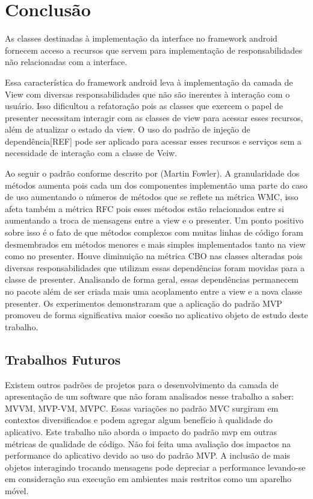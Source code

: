 \chapter{Conclusão}

As classes destinadas à implementação da interface no framework android fornecem
acceso a recursos que servem para implementação de responsabilidades não
relacionadas com a interface.

Essa característica do framework android leva à implementação da camada de View
com diversas responsabilidades que não são inerentes à interação com o
usuário. Isso dificultou a refatoração pois as classes que exercem o papel de
presenter necessitam interagir com as classes de view para acessar esses
recursos, além de atualizar o estado da view. O uso do padrão de injeção de
dependência[REF] pode ser aplicado para acessar esses recursos e serviços sem a
necessidade de interação com a classe de Veiw.

Ao seguir o padrão conforme descrito por (Martin Fowler). A granularidade dos
métodos aumenta pois cada um dos componentes implementão uma parte do caso de
uso aumentando o números de métodos que se reflete na métrica WMC, isso afeta
também a métrica RFC pois esses métodos estão relacionados entre si aumentando a
troca de mensagens entre a view e o presenter. Um ponto positivo sobre isso é o
fato de que métodos  complexos com muitas linhas de código foram desmembrados em
métodos menores e mais simples implementados tanto na view como no presenter.
Houve diminuição na métrica CBO nas classes alteradas pois diversas
responsabilidades que utilizam essas dependências foram movidas para a classe de
presenter. Analisando de forma geral, essas dependências permanecem no pacote
além de ser criada mais uma acoplamento entre a view e a nova classe presenter.
Os experimentos demonstraram que a aplicação do padrão MVP promoveu de forma
significativa maior coesão no aplicativo objeto de estudo deste trabalho.


\section{Trabalhos Futuros}

Existem outros padrões de projetos para o desenvolvimento da camada de
apresentação de um software que não foram analisados nesse trabalho a saber: 
MVVM, MVP-VM, MVPC. Essas variações no padrão MVC surgiram em contextos
diversificados e podem agregar algum benefício à qualidade do aplicativo.
Este trabalho não aborda o impacto do padrão mvp em outras métricas de qualidade
de código.
Não foi feita uma avaliação dos impactos na performance do aplicativo devido ao
uso do padrão MVP. A inclusão de mais objetos interagindo trocando mensagens
pode depreciar a performance levando-se em consideração sua execução em
ambientes mais restritos como um aparelho móvel.

